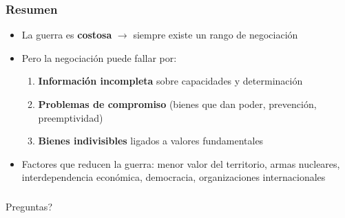 
\begin{frame}
\frametitle{Resumen}
\centering

\begin{itemize}
  \item La guerra es \textbf{costosa} $\rightarrow$ siempre existe un rango de negociación
  \item Pero la negociación puede fallar por:
  \begin{enumerate}
    \item \textbf{Información incompleta} sobre capacidades y determinación
    \item \textbf{Problemas de compromiso} (bienes que dan poder, prevención, preemptividad)
    \item \textbf{Bienes indivisibles} ligados a valores fundamentales
  \end{enumerate}
  \item<2-> Factores que reducen la guerra: menor valor del territorio, armas nucleares, interdependencia económica, democracia, organizaciones internacionales
\end{itemize}

\end{frame}

\begin{frame}
\frametitle{}
\centering

Preguntas?

\end{frame}
\note{}
